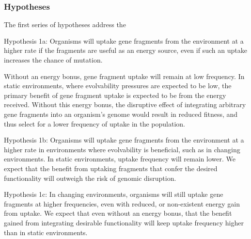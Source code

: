 \subsubsection{Hypotheses}

The first series of hypotheses address the 

Hypothesis 1a: Organisms will uptake gene fragments from the environment at a higher rate if the fragments are useful as an energy source, even if such an uptake increases the chance of mutation. 

Without an energy bonus, gene fragment uptake will remain at low frequency. In static environments, where evolvability pressures are expected to be low, the primary benefit of gene fragment uptake is expected to be from the energy received. Without this energy bonus, the disruptive effect of integrating arbitrary gene fragments into an organism’s genome would result in reduced fitness, and thus select for a lower frequency of uptake in the population.

Hypothesis 1b: Organisms will uptake gene fragments from the environment at a higher rate in environments where evolvability is beneficial, such as in changing environments. In static environments, uptake frequency will remain lower. We expect that the benefit from uptaking fragments that confer the desired functionality will outweigh the risk of genomic disruption.

Hypothesis 1c: In changing environments, organisms will still uptake gene fragments at higher frequencies, even with reduced, or non-existent energy gain from uptake. We expect that even without an energy bonus, that the benefit gained from integrating desirable functionality will keep uptake frequency higher than in static environments.